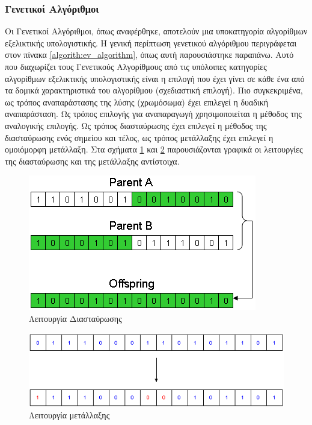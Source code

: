 \documentclass{assignment}
\begin{document}
\subsubsection*{Γενετικοί Αλγόριθμοι}
Οι Γενετικοί Αλγόριθμοι, όπως αναφέρθηκε, αποτελούν μια υποκατηγορία
αλγορίθμων εξελικτικής υπολογιστικής. Η γενική περίπτωση γενετικού αλγόριθμου
περιγράφεται στον πίνακα \ref{algorith:ev_algorithm}, όπως αυτή παρουσιάστηκε
παραπάνω. Αυτό που διαχωρίζει τους Γενετικούς Αλγορίθμους από τις υπόλοιπες
κατηγορίες αλγορίθμων εξελικτικής υπολογιστικής είναι η επιλογή που έχει γίνει
σε κάθε ένα από τα δομικά χαρακτηριστικά του αλγορίθμου (σχεδιαστική επιλογή).
Πιο συγκεκριμένα, ως τρόπος αναπαράστασης της λύσης (χρωμόσωμα) έχει επιλεγεί
η δυαδική αναπαράσταση. Ως τρόπος επιλογής για αναπαραγωγή χρησιμοποιείται
η μέθοδος της αναλογικής επιλογής. Ως τρόπος διασταύρωσης έχει επιλεγεί η
μέθοδος της διασταύρωσης ενός σημείου και τέλος, ως τρόπος μετάλλαξης έχει
επιλεγεί η ομοιόμορφη μετάλλαξη. Στα σχήματα \ref{fig:crossover} και
\ref{fig:mutation} παρουσιάζονται γραφικά οι λειτουργίες της διασταύρωσης και
της μετάλλαξης αντίστοιχα.
\begin{figure}
\begin{center}
    \includegraphics[scale=0.7, keepaspectratio]{images/crossover.png}
\caption{Λειτουργία Διασταύρωσης}
\label{fig:crossover}
\end{center}
\end{figure}

\begin{figure}
\begin{center}
    \includegraphics[scale=0.6, keepaspectratio]{images/mutation.png}
\caption{Λειτουργία μετάλλαξης}
\label{fig:mutation}
\end{center}
\end{figure}
\end{document}
